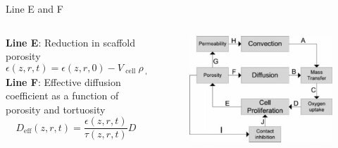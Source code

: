 \documentclass[11pt,t]{beamer}
\begin{document}
\begin{frame}[fragile]{Line E and F}  

	\begin{columns}[t]
		\begin{column}{.75\textwidth}
\textbf{Line E}: Reduction in scaffold porosity
\[
\epsilon ( z , r , t ) = \epsilon ( z , r , 0 ) - V _ { \text { cell } } \rho _ { \text { cell } } ( z , r , t )
\]
\textbf{Line F}: Effective diffusion coefficient as a function of porosity and tortuosity
\[
D _ { \mathrm { eff } } ( z , r , t ) = \frac { \epsilon ( z , r , t ) } { \tau ( z , r , t ) } D
\]

		\end{column}
		\begin{column}{.25\textwidth}
			
			\begin{figure}
			\centering
			\includegraphics[width=\textwidth]{math_scheme}
			
			\end{figure}
		\end{column}
	\end{columns}	
		
\end{frame}
\end{document}

